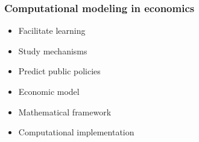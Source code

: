 \begin{frame}\frametitle{Computational modeling in economics}

	\begin{multicols}{2}
	\vspace{0.3cm}
	\begin{itemize}\setlength\itemsep{1em}
	\item Facilitate learning
	\item Study mechanisms
	\item Predict public policies
	\end{itemize}

	\pause

  \vspace{0.3cm}
	\begin{itemize}\setlength\itemsep{1em}
	\item Economic model
	\item Mathematical framework
	\item Computational implementation
	\end{itemize}
	\end{multicols}

\end{frame}

